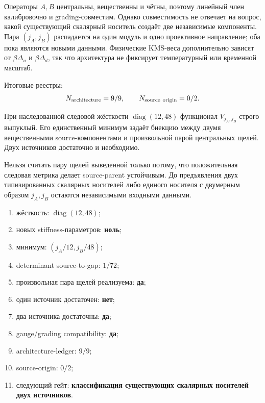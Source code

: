 Операторы $A,B$ центральны, вещественны и чётны, поэтому линейный член
калибровочно и grading-совместим. Однако совместимость не отвечает на вопрос,
какой существующий скалярный носитель создаёт две независимые компоненты.
Пара $(j_A,j_B)$ распадается на один модуль и одно проективное направление;
оба пока являются новыми данными. Физические KMS-веса дополнительно зависят
от $\beta\Delta_u$ и $\beta\Delta_d$, так что архитектура не фиксирует
температурный или временной масштаб.

Итоговые реестры:
\begin{equation}
 N_{\rm architecture}=9/9,
 \qquad N_{\rm source\ origin}=0/2.
 \label{eq:v8-extra-mass-two-source-ledgers}
\end{equation}

\begin{theorem}
При наследованной следовой жёсткости $\operatorname{diag}(12,48)$ функционал
$V_{j_A,j_B}$ строго выпуклый. Его единственный минимум задаёт биекцию между
двумя вещественными source-компонентами и произвольной парой центральных
щелей. Двух источников достаточно и необходимо.
\end{theorem}

\begin{nogocriterion}
Нельзя считать пару щелей выведенной только потому, что положительная
следовая метрика делает source-parent устойчивым. До предъявления двух
типизированных скалярных носителей либо единого носителя с двумерным образом
$j_A,j_B$ остаются независимыми входными данными.
\end{nogocriterion}

\begin{protocol}\begin{enumerate}
\item жёсткость: \textbf{$\operatorname{diag}(12,48)$};
\item новых stiffness-параметров: \textbf{ноль};
\item минимум: \textbf{$(j_A/12,j_B/48)$};
\item determinant source-to-gap: \textbf{$1/72$};
\item произвольная пара щелей реализуема: \textbf{да};
\item один источник достаточен: \textbf{нет};
\item два источника достаточны: \textbf{да};
\item gauge/grading compatibility: \textbf{да};
\item architecture-ledger: \textbf{$9/9$};
\item source-origin: \textbf{$0/2$};
\item следующий гейт: \textbf{классификация существующих скалярных носителей двух источников}.
\end{enumerate}\end{protocol}

